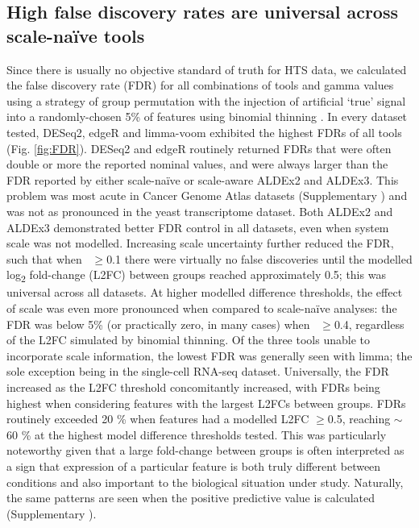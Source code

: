\documentclass[10pt,letterpaper]{article}
\begin{document}

\subsection*{High false discovery rates are universal across scale-na\"ive tools}
Since there is usually no objective standard of truth for HTS data, we calculated the false discovery rate (FDR) for all combinations of tools and gamma values using a strategy of group permutation with the injection of artificial `true' signal into a randomly-chosen 5\% of  features using binomial thinning \cite{gerard_data-based_2020}. In every dataset tested, DESeq2, edgeR and limma-voom exhibited the highest FDRs of all tools (Fig. \ref{fig:FDR}). DESeq2 and edgeR routinely returned FDRs that were often double or more the reported nominal values, and were always larger than the FDR reported by either scale-na\"ive or scale-aware ALDEx2 and ALDEx3. This problem was most acute in Cancer Genome Atlas datasets (Supplementary ) and was not as pronounced in the yeast transcriptome dataset. Both ALDEx2 and ALDEx3 demonstrated better FDR control in all datasets, even when system scale was not modelled. Increasing scale uncertainty further reduced the FDR, such that when \textgamma~$\geq$0.1 there were virtually no false discoveries until the modelled log\textsubscript{2} fold-change (L2FC) between groups reached approximately 0.5; this was universal across all datasets. At higher modelled difference thresholds, the effect of scale was even more pronounced when compared to scale-na\"ive analyses: the FDR was below 5\% (or practically zero, in many cases) when \textgamma~$\geq$0.4, regardless of the L2FC simulated by binomial thinning. Of the three tools unable to incorporate scale information, the lowest FDR was generally seen with limma; the sole exception being in the single-cell RNA-seq dataset. Universally, the FDR increased as the L2FC threshold concomitantly increased, with FDRs being highest when considering features with the largest L2FCs between groups. FDRs routinely exceeded 20 \% when features had a modelled L2FC $\geq$0.5, reaching $\sim$60 \% at the highest model difference thresholds tested. This was particularly noteworthy given that a large fold-change between groups is often interpreted as a sign that expression of a particular feature is both truly different between conditions and also important to the biological situation under study. Naturally, the same patterns are seen when the positive predictive value is calculated (Supplementary ).
\end{document}
